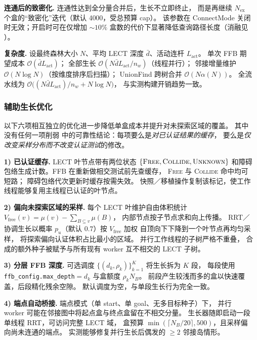 \documentclass[journal]{IEEEtran}
\begin{document}
\textbf{连通后的致密化.}
连通性达到全分量合并后，生长不立即终止，
而是再继续 $N_\text{ex}$ 个盒的“致密化”迭代（默认 4000，受总预算 cap）。
该参数在 ConnectMode 关闭时无效；开启时可在仅增加 $\sim\!10\%$
盒数的代价下显著降低查询路径长度（消融见 ）。

\textbf{复杂度.}
设最终森林大小 $N$、平均 LECT 深度 $\bar d$、活动连杆 $L_\text{act}$。
单次 FFB 期望成本 $\mathcal{O}(\bar d L_\text{act})$；
全部生长 $\mathcal{O}(N\bar d L_\text{act}/n_w)$（线程并行）；
邻接增量维护 $\mathcal{O}(N\log N)$（按维度排序后扫描）；
UnionFind 跨树合并 $\mathcal{O}(N\alpha(N))$。
全流水线为 $\mathcal{O}\!\bigl((N\bar d L_\text{act})/n_w + N\log N\bigr)$，
与实测构建开销趋势一致。

\subsubsection{辅助生长优化}\label{sec:grower_opts}

以下六项相互独立的优化进一步降低单盒成本并提升对未探索区域的覆盖。
其中没有任何一项削弱 
中的可靠性结论：每项要么是\emph{对已认证结果的缓存}，
要么是\emph{仅改变采样分布而不改变认证测试}的修改。

\textbf{1) 已认证缓存.}
LECT 叶节点带有两位状态
$\{\textsc{Free},\textsc{Collide},\textsc{Unknown}\}$
和障碍包络生成计数。FFB 在重新做相交测试前先查缓存，
\textsc{Free} 与 \textsc{Collide} 命中均可短路；
障碍包络代次更新时缓存按需失效。
快照／移植操作复制该标记，使工作线程能够复用主线程已认证的叶节点。

\textbf{2) 偏向未探索区域的采样.}
每个 LECT 叶维护自由体积统计
$V_\text{free}(v)=\mu(v)-\sum_{B\subseteq v}\mu(B)$，
内部节点按子节点求和向上传播。
RRT／协调生长以概率 $p_u$（默认 $0.7$）按 $V_\text{free}$ 加权
自顶向下下降到一个叶节点再均匀采样，
将探索偏向认证体积占比最小的区域。
并行工作线程的子树严格不重叠，
合成的额外种子被赋予与所有现有 worker 互不相交的 LECT 子树。

\textbf{3) 分层 FFB 深度.}
可选调度 $\{(d_k,\rho_k)\}_{k=1}^{K}$ 将生长拆为 $K$ 段，
每段使用 \texttt{ffb\_config.max\_depth}$=d_k$ 与盒额度 $\rho_k N_B$。
前段产生较浅而多的盒以快速覆盖，后段精化残余空隙。
默认调度为空，与单段生长行为完全一致。

\textbf{4) 端点自动桥接.}
端点模式（单 start、单 goal、无多目标种子）下，
并行 worker 可能在邻接图中将起点盒与终点盒留在不相交分量。
生长器随即启动一段单线程 RRT，可访问完整 LECT 域，
盒预算 $\min(\lceil N_B/20\rceil,500)$，且采样偏向尚未连通的端点。
实测能够修复并行生长后偶发的 $\ge 2$ 邻接岛情形。
\end{document}

